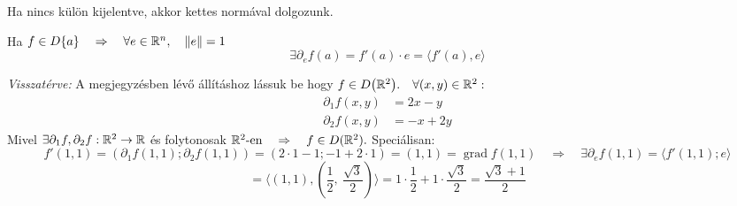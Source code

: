 \documentclass[a4paper,11.5pt]{article}
\DeclareMathOperator{\grad}{grad}
\newcommand{\norm}[1]{\left\lVert#1\right\rVert}
\begin{document}
	\begin{note}
		Ha nincs külön kijelentve, akkor kettes normával dolgozunk.
	\end{note}
	\begin{note}
		Ha $f\in D\{a\}\quad \Rightarrow\quad \forall e\in\R^n,\quad \norm{e}=1$\[ \exists\partial_ef(a)=f'(a)\cdot e=\langle f'(a),e\rangle \]
	\end{note}
	\textit{Visszatérve:} A megjegyzésben lévő állításhoz lássuk be hogy $f\in D\big(\mathbb{R}^2\big).\quad \forall (x,y)\in\mathbb{R}^2:$
	\begin{align*}
		\partial_1f(x,y)&=2x-y\\
		\partial_2f(x,y)&=-x+2y	
	\end{align*}
	Mivel $\exists\partial_1f, \partial_2f: \mathbb{R}^2\to\mathbb{R}$ és folytonosak  $\mathbb{R}^2\text{-en}\quad \Rightarrow\quad f\in D(\mathbb{R}^2).$ Speciálisan:
	\[ f'(1,1)=(\partial_1f(1,1);\partial_2f(1,1))=(2\cdot1-1;-1+2\cdot1)=(1,1)=\grad f(1,1)\quad \Rightarrow\quad \exists\partial_ef(1,1)=\langle f'(1,1);e\rangle \]
	\[ =\Big\langle(1,1),\left(\frac{1}{2},\ \frac{\sqrt{3}}{2}\right)\Big\rangle=1\cdot\frac{1}{2}+1\cdot\frac{\sqrt{3}}{2}=\frac{\sqrt{3}+1}{2} \]
	
\end{document}

